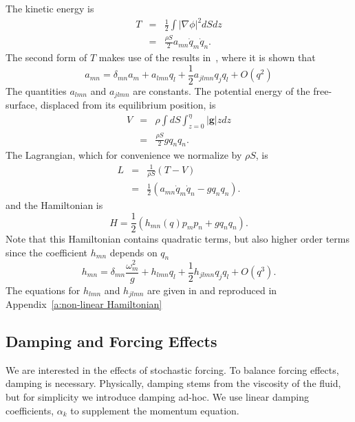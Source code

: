 The kinetic energy is
\begin{eqnarray*}
T & = & \frac12 \int | \nabla \phi |^2 dS dz\\
& = & \frac{\rho S}{2} a_{mn} \dot{q}_m \dot{q}_n .
\end{eqnarray*}
The second form of $T$ makes use of the results in~\citet{miles76:_nonlin}, where it is shown that
\begin{equation}
a_{mn} = \delta_{mn} a_m + a_{lmn} q_l + \frac12 a_{jlmn} q_j q_l + O ( q^2 )
\end{equation}
The quantities $a_{lmn}$ and $a_{jlmn}$ are constants. The potential energy of the free-surface, displaced from its equilibrium position, is
\begin{eqnarray}
V & = & \rho \int dS \int^{\eta}_{z = 0} |\boldsymbol{g}| z dz \label{e:potential energy}\\
& = & \frac{\rho S}{2} g q_n q_n. \nonumber
\end{eqnarray}
The Lagrangian, which for convenience we normalize by $\rho S$, is
\begin{eqnarray*}
L & = & \frac{1}{\rho S} ( T - V )\\
& = & \frac12 ( a_{mn} \dot{q}_m \dot{q}_n - g q_n q_n ) .
\end{eqnarray*}
and the Hamiltonian is
\begin{equation}
\label{e:Hamiltonian}
H = \frac12 (h_{mn}(q) p_m p_n + g q_n q_n).
\end{equation}
Note that this Hamiltonian contains quadratic terms, but also higher order terms since the coefficient $h_{mn}$ depends on $q_n$
\begin{equation}
\label{e:hamiltonian coefficient expansion}
h_{mn} = \delta_{mn} \frac{\omega_m^2}{g} + h_{lmn} q_l + \frac12 h_{jlmn} q_j q_l + O(q^3).
\end{equation}
The equations for $h_{lmn}$ and $h_{jlmn}$ are given in \citet{miles76:_nonlin} and reproduced in Appendix~\ref{a:non-linear Hamiltonian}

\subsection{Damping and Forcing Effects}
\label{s:damping}

We are interested in the effects of stochastic forcing. To balance forcing effects, damping is necessary. Physically, damping stems from the viscosity of the fluid, but for simplicity we introduce damping ad-hoc. We use linear damping coefficients, $\alpha_k$ to supplement the momentum equation.

